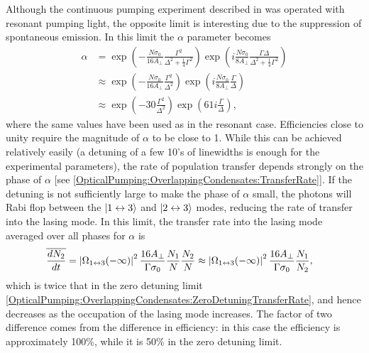 Although the continuous pumping experiment described in  was operated with resonant pumping light, the opposite limit is interesting due to the suppression of spontaneous emission.  In this limit the $\alpha$ parameter becomes
\begin{align}
    \alpha &= \exp\left( - \frac{N \sigma_0}{16 A_\perp} \frac{\Gamma^2}{\Delta^2 + \frac{1}{4}\Gamma^2}\right) \exp \left(i \frac{N \sigma_0}{8 A_\perp} \frac{\Gamma \Delta}{\Delta^2 + \frac{1}{4} \Gamma^2}\right) \\
    &\approx \exp \left( - \frac{N \sigma_0}{16 A_\perp} \frac{\Gamma^2}{\Delta^2}\right) \exp \left(i \frac{N \sigma_0}{8 A_\perp} \frac{\Gamma}{\Delta}\right) \\
    &\approx \exp \left( - 30 \frac{\Gamma^2}{\Delta^2}\right) \exp \left( 61 i \frac{\Gamma}{\Delta} \right) \label{OpticalPumping:FarDetunedLimit:ApproxAlphaNumerical},
\end{align}
where the same values have been used as in the resonant case.  Efficiencies close to unity require the magnitude of $\alpha$ to be close to 1.  While this can be achieved relatively easily (a detuning of a few 10's of linewidths is enough for the experimental parameters), the rate of population transfer depends strongly on the phase of $\alpha$ [see \eqref{OpticalPumping:OverlappingCondensates:TransferRate}].  If the detuning is not sufficiently large to make the phase of $\alpha$ small, the photons will Rabi flop between the ${\left|1 \leftrightarrow 3\right>}$ and ${\left|2 \leftrightarrow 3\right>}$ modes, reducing the rate of transfer into the lasing mode.  In this limit, the transfer rate into the lasing mode averaged over all phases for $\alpha$ is
\begin{align}
    \overline{\frac{d N_2}{dt}} &= \abs{\Omega_{1\leftrightarrow 3}(-\infty)}^2 \frac{16 A_\perp}{\Gamma \sigma_0} \frac{N_1}{N} \frac{N_2}{N} \approx \abs{\Omega_{1\leftrightarrow 3}(-\infty)}^2 \frac{16 A_\perp}{\Gamma \sigma_0} \frac{N_1}{N_2}, \label{OpticalPumping:OverlappingCondensates:IntermediateDetuningTransferRate}
\end{align}
which is twice that in the zero detuning limit \eqref{OpticalPumping:OverlappingCondensates:ZeroDetuningTransferRate}, and hence decreases as the occupation of the lasing mode increases.  The factor of two difference comes from the difference in efficiency: in this case the efficiency is approximately 100\%, while it is 50\% in the zero detuning limit.

